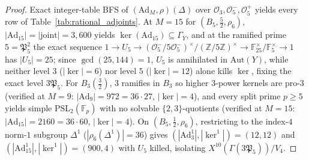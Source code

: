 \documentclass[11pt]{amsart}
\numberwithin{equation}{section}
\theoremstyle{plain}
\theoremstyle{definition}\newtheorem{definition}[theorem]{Definition}
\theoremstyle{remark}\newtheorem{remark}[theorem]{Remark}
\newcommand{\Z}{\mathbb{Z}}
\newcommand{\F}{\mathbb{F}}
\newcommand{\calO}{\mathcal{O}}
\newcommand{\frP}{\mathfrak{P}}
\newcommand{\PSL}{\mathrm{PSL}}
\newcommand{\Aut}{\mathrm{Aut}}
\newcommand{\Ad}{\mathrm{Ad}}
\begin{document}
\begin{proof}
Exact integer-table BFS of $(\Ad_M, \rho)(\Delta)$ over $\calO_3, \calO_5^-, \calO_5^+$ yields every row of Table~\ref{tab:rational_adjoints}. At $M=15$ for $(B_5,\frac{5}{2},\rho_6)$, $|\Ad_{15}| = |\mathrm{joint}| = 3{,}600$ yields $\ker(\Ad_{15}) \subseteq \Gamma_Y$, and at the ramified prime $5 = \frP_5^2$ the exact sequence $1 \to U_5 \to (\calO_5^-/5\calO_5^-)^\times/(\Z/5\Z)^\times \to \F_{25}^\times/\F_5^\times \to 1$ has $|U_5| = 25$; since $\gcd(25,144)=1$, $U_5$ is annihilated in $\Aut(Y)$, while neither level $3$ ($|\ker|=6$) nor level $5$ ($|\ker|=12$) alone kills $\ker$, fixing the exact level $3\frP_5$. For $B_3(\frac{3}{2})$, $3$ ramifies in $B_3$ so higher $3$-power kernels are pro-$3$ (verified at $M=9$: $|\Ad_9|=972=36\cdot 27$, $|\ker|=4$), and every split prime $p\ge 5$ yields simple $\PSL_2(\F_p)$ with no solvable $\{2,3\}$-quotients (verified at $M=15$: $|\Ad_{15}|=2160=36\cdot 60$, $|\ker|=4$). On $(B_5,\frac{1}{2},\rho_6)$, restricting to the index-$4$ norm-$1$ subgroup $\Delta^1$ ($|\rho_6(\Delta^1)|=36$) gives $(|\Ad_3^1|,|\ker^1|)=(12,12)$ and $(|\Ad_{15}^1|,|\ker^1|)=(900,4)$ with $U_5$ killed, isolating $X^{10}(\Gamma(3\frP_5))/V_4$.
\end{proof}
\end{document}
